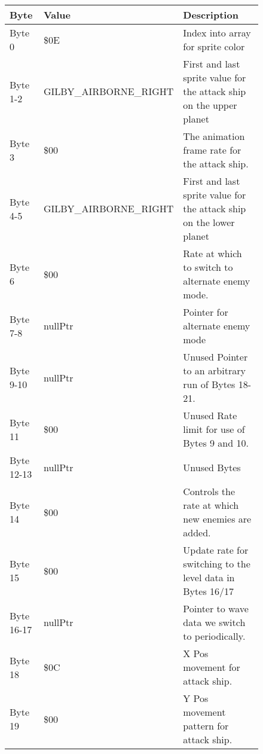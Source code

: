 \begin{figure}[H]
  {
  \setlength{\tabcolsep}{3.0pt}
  \setlength\cmidrulewidth{\heavyrulewidth} %
  \begin{adjustbox}{width=12cm}

\begin{tabular}{lll}
\toprule
 Byte       & Value                    & Description                                                         \\
\midrule
 Byte 0     & \$0E                      & Index into array for sprite color                                   \\
 Byte 1-2   & GILBY\_AIRBORNE\_RIGHT     & First and last sprite value for the attack ship on the upper planet \\
 Byte 3     & \$00                      & The animation frame rate for the attack ship.                       \\
 Byte 4-5   & GILBY\_AIRBORNE\_RIGHT     & First and last sprite value for the attack ship on the lower planet \\
 Byte 6     & \$00                      & Rate at which to switch to alternate enemy mode.                    \\
 Byte 7-8   & nullPtr                  & Pointer for alternate enemy mode                                    \\
 Byte 9-10  & nullPtr                  & Unused Pointer to an arbitrary run of Bytes 18-21.                  \\
 Byte 11    & \$00                      & Unused Rate limit for use of Bytes 9 and 10.                        \\
 Byte 12-13 & nullPtr                  & Unused Bytes                                                        \\
 Byte 14    & \$00                      & Controls the rate at which new enemies are added.                   \\
 Byte 15    & \$00                      & Update rate for switching to the level data in Bytes 16/17          \\
 Byte 16-17 & nullPtr                  & Pointer to wave data we switch to periodically.                     \\
 Byte 18    & \$0C                      & X Pos movement for attack ship.                                     \\
 Byte 19    & \$00                      & Y Pos movement pattern for attack ship.                             \\

\end{tabular}
\end{adjustbox}}
\end{figure}
